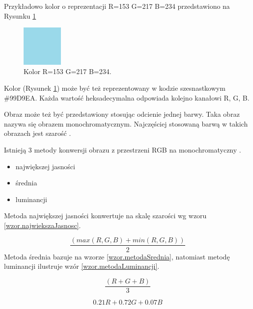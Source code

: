 \documentclass[a4paper,twoside,12pt]{book}
\begin{document}
    Przykładowo kolor o reprezentacji R=153 G=217 B=234 przedstawiono na Rysunku \ref{fig.mieszanieKolorowBlekitny}

    \begin{figure}
        \centering
        \includegraphics[width=2cm]{Obrazy/blekitny.jpg}
        \caption{Kolor R=153 G=217 B=234.}
        \label{fig.mieszanieKolorowBlekitny}
    \end{figure}

    Kolor (Rysunek \ref{fig.mieszanieKolorowBlekitny}) może być też reprezentowany w kodzie szesnastkowym \#99D9EA.
    Każda
    wartość heksadecymalna odpowiada kolejno kanałowi R, G, B.

    Obraz może też być przedstawiony stosując odcienie jednej barwy.
    Taka obraz nazywa się obrazem monochromatycznym.
    Najczęściej stosowaną barwą w takich obrazach jest szarość \cite{przestrzenieKolorow}.

    Istnieją 3 metody konwersji obrazu z przestrzeni RGB na monochromatyczny \cite{colorMixing}.
    \begin{itemize}
        \item największej jasności
        \item średnia
        \item luminancji
    \end{itemize}
    Metoda największej jasności konwertuje na skalę szarości wg wzoru \ref{wzor.najwiekszaJasnosc}.

    \large
    \begin{equation}
        \frac{(max(R, G, B) + min(R, G, B))}{2}
        \label{wzor.najwiekszaJasnosc}
    \end{equation}
    \normalsize
    Metoda średnia bazuje na wzorze \ref{wzor.metodaSrednia}, natomiast metodę luminancji ilustruje wzór
    \ref{wzor.metodaLuminancji}.

    \large
    \begin{equation}
        \frac{(R + G + B)}{3}
        \label{wzor.metodaSrednia}
    \end{equation}
    \normalsize

    \large
    \begin{equation}
        0.21 R + 0.72 G + 0.07 B
        \label{wzor.metodaLuminancji}
    \end{equation}
    \normalsize
\end{document}

